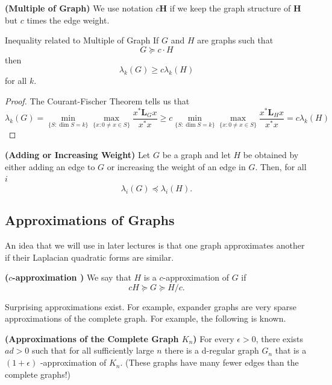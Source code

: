 \documentclass{article}
\newcommand{\bsl}[1]{\boldsymbol{#1}}
\newcommand{\bfs}[1]{\textbf{({#1}) }}
\begin{document}
\begin{defa}{\bfs{Multiple of Graph}}\label{be:mulineq}
We use notation $c\bsl{H}$ if we keep the graph structure of $\bsl{H}$ but $c$ times the edge weight.
\end{defa}


\begin{lema}{Inequality related to Multiple of Graph}
  If $G$ and $H$ are graphs such that
$$
G \succcurlyeq c \cdot H
$$
then
$$
\lambda_{k}(G) \geq c \lambda_{k}(H)
$$
for all $k$.
\end{lema} 
\begin{proof}
The Courant-Fischer Theorem tells us that
$$
\lambda_{k}(G)=\min _{\{S: \operatorname{dim} S=k\}} \max _{\{x: 0 \neq x \in S\}} \frac{x^{*} \bsl{L}_G x}{x^{*} x} \ge c \min _{\{S: \operatorname{dim} S=k\}} \max _{\{x: 0 \neq x \in S\}} \frac{x^{*} \bsl{L}_H x}{x^{*} x} = c\lambda_{k}(H)
$$
\end{proof}
\begin{cora}{\bfs{Adding or Increasing Weight}}
Let $G$ be a graph and let $H$ be obtained by either adding an edge to $G$ or increasing the weight of an edge in $G$. Then, for all $i$
$$
\lambda_{i}(G) \preccurlyeq \lambda_{i}(H) .
$$
\end{cora} 
\subsection{Approximations of Graphs}
An idea that we will use in later lectures is that one graph approximates another if their Laplacian quadratic forms are similar. 
\begin{defa}{\bfs{$c$-approximation }}
We  say that $H$ is a $c$-approximation of $G$ if $$ c H \succcurlyeq G \succcurlyeq H / c .$$
\end{defa}
Surprising approximations exist. For example, expander graphs are very sparse approximations of the complete graph. For example, the following is known.

\begin{thma}{\bfs{Approximations of the Complete Graph $K_n$}}
For every $\epsilon>0$, there exists $a d>0$ such that for all sufficiently large $n$ there is a d-regular graph $G_{n}$ that is a $(1+\epsilon)$ -approximation of $K_{n}$.
(These graphs have many fewer edges than the complete graphs!)
\end{thma}
\end{document}
